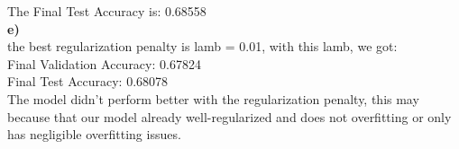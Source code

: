 \documentclass{article}
\begin{document}
\begin{enumerate}
    The Final Test Accuracy is: 0.68558 \\
    \textbf{e)} \\
    the best regularization penalty is lamb = 0.01, with this lamb, we got: \\
    Final Validation Accuracy: 0.67824\\
    Final Test Accuracy: 0.68078\\
    The model didn't perform better with the regularization penalty, this may because that our model already well-regularized and does not overfitting or only has negligible overfitting issues. \\

\end{enumerate}
\end{document}
